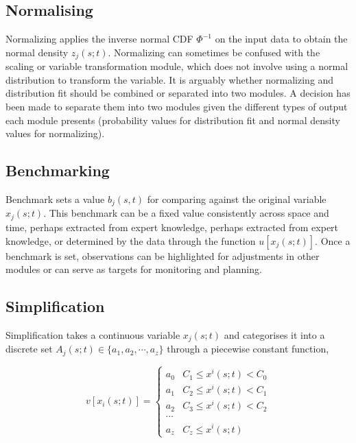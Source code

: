 \documentclass[
]{interact}
\begin{document}
\hypertarget{normalising}{%
\subsection{Normalising}\label{normalising}}

Normalizing applies the inverse normal CDF \(\Phi^{-1}\) on the input
data to obtain the normal density \(z_{j}(s;t)\). Normalizing can
sometimes be confused with the scaling or variable transformation
module, which does not involve using a normal distribution to transform
the variable. It is arguably whether normalizing and distribution fit
should be combined or separated into two modules. A decision has been
made to separate them into two modules given the different types of
output each module presents (probability values for distribution fit and
normal density values for normalizing).

\hypertarget{benchmarking}{%
\subsection{Benchmarking}\label{benchmarking}}

Benchmark sets a value \(b_j(s,t)\) for comparing against the original
variable \(x_j(s;t)\). This benchmark can be a fixed value consistently
across space and time, perhaps extracted from expert knowledge, perhaps
extracted from expert knowledge, or determined by the data through the
function \(u[x_j(s;t)]\). Once a benchmark is set, observations can be
highlighted for adjustments in other modules or can serve as targets for
monitoring and planning.

\hypertarget{simplification}{%
\subsection{Simplification}\label{simplification}}

Simplification takes a continuous variable \(x_j(s;t)\) and categorises
it into a discrete set \(A_j(s;t) \in \{a_1, a_2, \cdots, a_z\}\)
through a piecewise constant function,

\begin{equation}
v[x_i(s;t)] = 
\begin{cases}
a_0 & C_1 \leq x^i(s; t) < C_0 \\
a_1 & C_2 \leq x^i(s; t) < C_1 \\
a_2 & C_3 \leq x^i(s; t) < C_2 \\
\cdots \\
a_z & C_z \leq x^i(s; t)
\end{cases}
\end{equation}
\end{document}
